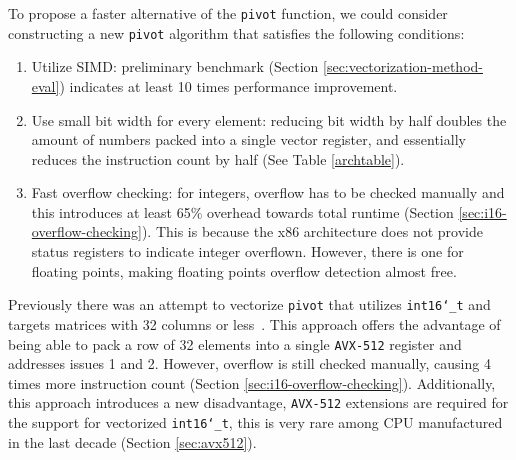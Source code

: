 \documentclass[logo,bsc,singlespacing,parskip]{infthesis}
\newcommand{\dtshort}{\texttt{int16\char`_t}}
\begin{document}
To propose a faster alternative of the \texttt{pivot} function, we could
consider constructing a new \texttt{pivot} algorithm that satisfies the
following conditions:
\begin{enumerate}

\item Utilize SIMD: preliminary benchmark (Section
\ref{sec:vectorization-method-eval}) indicates at least 10 times
performance improvement. 

\item Use small bit width for every element: reducing bit width by half doubles the
amount of numbers packed into a single vector register, and essentially reduces
the instruction count by half (See Table \ref{archtable}). 

\item Fast overflow checking: for integers, overflow has to be checked manually
and this introduces at least 65\% overhead towards total runtime (Section
\ref{sec:i16-overflow-checking}). This is because the x86 architecture does not
provide status registers to indicate integer overflown. However, there is one
for floating points, making floating points overflow detection almost free. 

\end{enumerate}


Previously there was an attempt to vectorize \texttt{pivot} that utilizes
\dtshort{} and targets matrices with 32 columns or less~\cite{FPL2}. This
approach offers the advantage of being able to pack a row of 32 elements into a
single \texttt{AVX-512} register and addresses issues 1 and 2. However, overflow
is still checked manually, causing 4 times more instruction count (Section
\ref{sec:i16-overflow-checking}). Additionally, this approach introduces a new
disadvantage, \texttt{AVX-512} extensions are required for the support for
vectorized \dtshort{}, this is very rare among CPU manufactured in the last
decade (Section \ref{sec:avx512}). 
\end{document}
